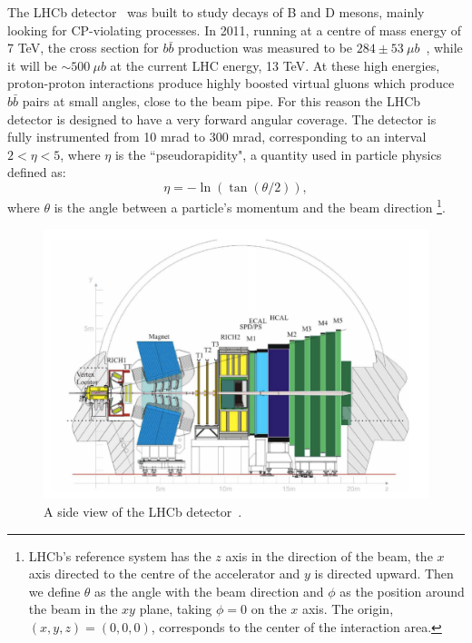 The LHCb detector~\cite{Alves:2008zz} was built to study decays of B and D mesons,
mainly looking for CP-violating processes. In 2011, running at a centre of mass energy of 7 TeV, 
the cross section for $b\bar{b}$ production was measured to be $284 \pm 53 ~\mu b$~\cite{Aaij:2010gn}, 
while it will be $\sim500 ~\mu b$ at the current LHC energy, 13 TeV.
At these high energies, proton-proton interactions produce highly boosted virtual gluons which produce $b\bar{b}$
pairs at small angles, close to the beam pipe. For this reason the LHCb detector is designed to have a very forward angular
coverage. The detector is fully instrumented from 10 mrad to 300 mrad, corresponding to an interval $2 < \eta < 5$, where $\eta$
is the ``pseudorapidity", a quantity used in particle physics defined as:
\begin{equation}
\label{pseudorap}
\eta = - \ln(\tan(\theta/2)),
\end{equation}
where $\theta$ is the angle between a particle's momentum and the beam direction
\footnote{LHCb's reference system has the $z$ axis in the direction of the beam, the $x$ axis directed to
the centre of the accelerator and $y$ is directed upward. Then we define $\theta$ as the angle with the beam
direction and $\phi$ as the position around the beam in the $xy$ plane, taking $\phi = 0$ on the $x$ axis.
The origin, $(x,y,z)=(0,0,0)$, corresponds to the center of the interaction area.}.

\begin{figure}[h]
\includegraphics[width=1.\linewidth]{Detector/figs/LHCb_official.png}
\caption{A side view of the LHCb detector~\cite{Alves:2008zz}.}
\label{fig:lhcb}
\end{figure}

